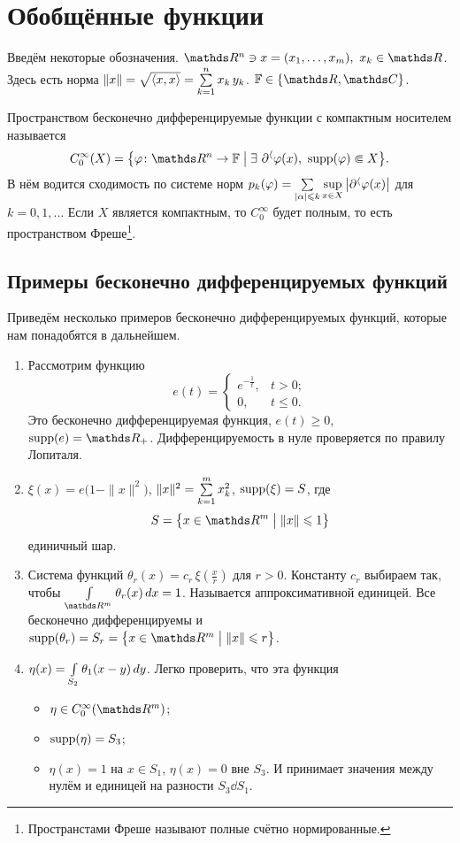 \section{Обобщённые функции}
Введём некоторые обозначения. $\R^n\ni x=(x_1,\dots,x_m),\ x_k\in\R$. Здесь есть норма $\|x\| = \sqrt{\langle x,x\rangle} = \sum\limits_{k = 1}^{n} x_k\,y_k$. $\F \in\{\R,\C\}$. 
\begin{Def} Пространством бесконечно дифференцируемые функции с компактным носителем называется\label{c08}
\[
  C_0^\infty(X) = \big\{\phi\colon \R^n\to\F\bigm|\exists\ \dl^\a\phi(x),\ \supp(\phi)\Subset X\big\}.
\]
 В нём водится сходимость по системе норм $p_k(\varphi) = \sum\limits_{|\alpha|\leqslant k}\sup\limits_{x\in X}\big|\partial^\langle\varphi(x)\big|$ для $k=0,1,\dots$ Если $X$ является компактным, то $C_0^\infty$ будет полным, то есть пространством Фреше\footnote{Пространстами Фреше называют полные счётно нормированные.}.
\end{Def}

\subsection{Примеры бесконечно дифференцируемых функций}
Приведём несколько примеров бесконечно дифференцируемых функций, которые нам понадобятся в дальнейшем.
\begin{enumerate}
\item Рассмотрим функцию
\[
  e(t) = \begin{cases}
e^{-\frac 1t},&t>0;\\
0,&t\le0.
\end{cases}
\]
Это бесконечно дифференцируемая функция, $e(t)\ge0$,  $\supp(e) = \R_+$. Дифференцируемость в нуле проверяется по правилу Лопиталя.
\item $\xi(x) = e\big(1-\|x\|^2\big)$, $\|x\|^2 = \sum\limits_{k = 1}^{m}x_k^2$, $\operatorname{supp}(\xi) = S$, где
\[
  S = \big\{x\in\R^m\bigm|\|x\|\le1\big\}
\]
единичный шар.

\item Система функций $\theta_r(x) = c_r\,\xi\left(\frac xr\right)$ для $r>0$. Константу $c_r$ выбираем так, чтобы $\Gint{\R^m}\theta_r(x)\,dx=1$.
Называется аппроксимативной единицей. Все бесконечно дифференцируемы и $\supp(\theta_r) = S_r = \big\{x\in\R^m\bigm|\|x\|\le r\big\}$.
\item $\eta(x) = \int\limits_{S_2}\theta_1(x-y)\,dy$. Легко проверить, что эта функция \begin{itemize}
\item $\eta\in C_0^\infty(\R^m)$;
\item $\operatorname{supp}(\eta) = S_3$;
\item $\eta(x)=1$ на $x\in S_1$, $\eta(x)=0$ вне $S_3$. И принимает значения между нулём и единицей на разности $S_3\dd S_1$.
\end{itemize}
\end{enumerate}
